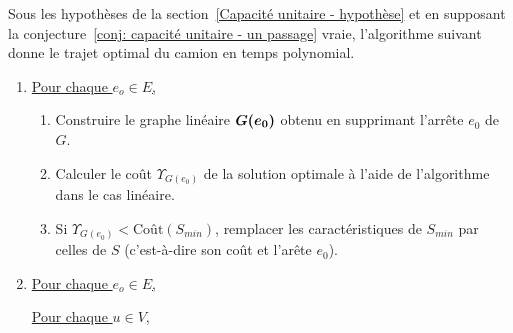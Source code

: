 \begin{thm} \label{thm: capacité unitaire - optimalité}
Sous les hypothèses de la section~\ref{Capacité unitaire - hypothèse} et en supposant la conjecture~\ref{conj: capacité unitaire - un passage} vraie, l'algorithme suivant donne le trajet optimal du camion en temps polynomial.
\end{thm}
\begin{enumerate}
\item \uline{Pour chaque $e_o \in E$,}
  \begin{enumerate}
  \item Construire le graphe linéaire $\boldsymbol{G(e_0)}$ obtenu en supprimant l'arrête $e_0$ de $G$.
  \item Calculer le coût $\Upsilon_{G(e_0)}$ de la solution optimale à l'aide de l'algorithme dans le cas linéaire.
  \item Si $\Upsilon_{G(e_0)} < \mbox{Coût}(S_{min})$, remplacer les caractéristiques de $S_{min}$ par celles de $S$ (c'est-à-dire son coût et l'arête $e_0$).
  \end{enumerate}
\item \uline{Pour chaque $e_o \in E$,}

  \uline{Pour chaque $u \in V$,}


\end{enumerate}
